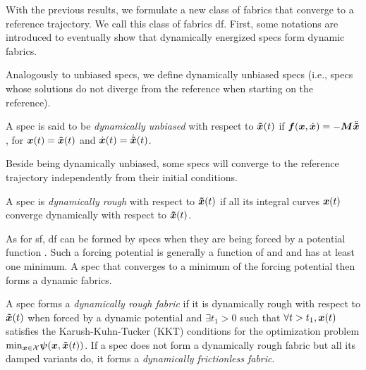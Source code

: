 With the previous results, we formulate a new class of fabrics that converge to a
reference trajectory. We call this class of fabrics \acl{df}. 
First, some notations are introduced to eventually show that dynamically energized specs
form dynamic fabrics.
%
\iffalse%
\begin{definition}
A spec is called \textit{dynamically converging} towards a reference $\xt(t)$,
if and only if
\[
  \exists t_1 \geq 0, \forall t \geq t_1:
      \xddot(t) = \xtddot(t), \xdot(t) = \xtdot(t), \x(t) = \xt(t),
\]
For clarity, we say that the spec is dynamically converging with respect to $\xt$, or
dynamically converging for short if the reference is clear from the context.
\end{definition}
\fi
%
Analogously to unbiased specs, we define dynamically unbiased specs (i.e., specs whose
solutions do not diverge from the reference \xt{} when starting on the reference).
\begin{definition}
A spec is said to be \textit{dynamically unbiased} with respect to $\xt(t)$ if
$\bm{f}(\bm{x}, \dot{\bm{x}}) = -\bm{M}\ddot{\bm{\tilde{x}}}$, for $\bm{x}(t) = \bm{\tilde{x}}(t)$ and $\dot{\bm{x}}(t) = \dot{\bm{\tilde{x}}}(t)$.
\end{definition}

Beside being dynamically unbiased, some specs will converge to the reference trajectory
independently from their initial conditions.

\begin{definition}
A spec is \textit{dynamically rough} with respect to $\xt(t)$ if all
its integral curves $\bm{x}(t)$ converge dynamically with respect to $\xt(t)$.
\end{definition}

As for \ac{sf}, \ac{df} can be formed by
specs when they are being forced by a potential function \forc. Such a forcing potential is
generally a function of \x{} and \xt{} and has at least one minimum. A spec that converges
to a minimum of the forcing potential then forms a dynamic fabrics.

\begin{definition}
A spec forms a \textit{dynamically rough fabric} if it is dynamically rough with respect
to $\xt(t)$ when forced by a dynamic potential and 
$\exists t_1 > 0$ such that $\forall t>t_1, \bm{x}(t)$ satisfies the
Karush-Kuhn-Tucker (KKT) conditions for the optimization problem $\text{min}_{\bm{x}\in\mathcal{X}} \bm{\psi}(\bm{x},
\bm{\tilde{x}}(t))$. If a spec does not form a dynamically rough fabric but all its damped variants
do, it forms a \textit{dynamically frictionless fabric}.
\end{definition}

